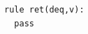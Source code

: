 \begin{figure}[t]
\begin{minipage}[t]{5cm}
\begin{lstlisting}
rule ret(deq,v):
  pass

\end{lstlisting}
\end{minipage}


%
%
%

\end{figure}
